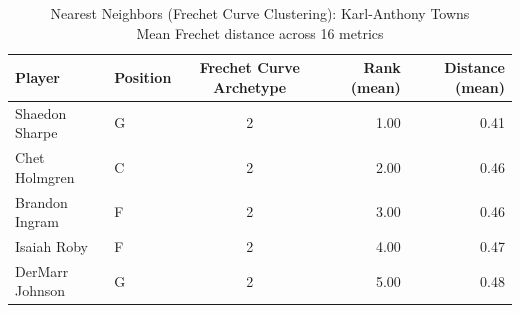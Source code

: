 \begin{table}[t]
\caption*{
{\fontsize{20}{25} Nearest Neighbors (Frechet Curve Clustering): Karl-Anthony Towns\fontsize{12}{15}\selectfont } \\ 
{\fontsize{14}{17}\selectfont  Mean Frechet distance across 16 metrics\fontsize{12}{15}\selectfont }
} 
\fontsize{12.0pt}{14.0pt}\selectfont
\begin{tabular*}{\linewidth}{@{\extracolsep{\fill}}llcrr}
\toprule
Player & Position & Frechet Curve Archetype & Rank (mean) & Distance (mean) \\ 
\midrule\addlinespace[2.5pt]
Shaedon Sharpe & G & 2 & 1.00 & 0.41 \\ 
Chet Holmgren & C & 2 & 2.00 & 0.46 \\ 
Brandon Ingram & F & 2 & 3.00 & 0.46 \\ 
Isaiah Roby & F & 2 & 4.00 & 0.47 \\ 
DerMarr Johnson & G & 2 & 5.00 & 0.48 \\ 
\bottomrule
\end{tabular*}
\end{table}

